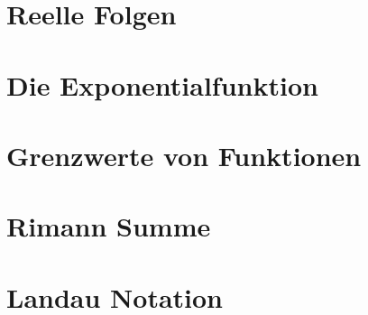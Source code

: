 \documentclass[12pt, twoside, openright]{report}
\theoremstyle{definition} %
\theoremstyle{definition} %
\theoremstyle{definition} %
\theoremstyle{definition} %
\theoremstyle{definition} %
\theoremstyle{remark} %
\begin{document}
		\section{Reelle Folgen}
		
		
		\section{Die Exponentialfunktion}
		\section{Grenzwerte von Funktionen}
		\section{Rimann Summe}
		\section{Landau Notation}
		
\end{document}
